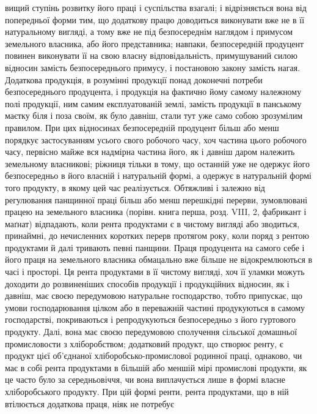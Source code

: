 \parcont{}  %
вищий ступінь розвитку його праці і суспільства взагалі; і відрізняється вона
від попередньої форми тим, що додаткову працю доводиться виконувати вже
не в її натуральному вигляді, а тому вже не під безпосереднім наглядом і
примусом земельного власника, або його представника; навпаки, безпосередній
продуцент повинен виконувати її на свою власну відповідальність, примушуваний
силою відносин замість безпосереднього примусу, і постановою закону замість
нагая. Додаткова продукція, в розумінні продукції понад доконечні потреби
безпосереднього продуцента, і продукція на фактично йому самому належному
полі продукції, ним самим експлуатованій землі, замість продукції в панському
маєтку біля і поза своїм, як було давніш, стали тут уже само собою зрозумілим
правилом. При цих відносинах безпосередній продуцент більш або менш
порядкує застосуванням усього свого робочого часу, хоч частина цього робочого
часу, первісно майже вся надмірна частина його, як і давніш даром належить
земельному власникові; ріжниця тільки в тому, що останній уже не
одержує його безпосередньо в його власній і натуральній формі, а одержує в
натуральній формі того продукту, в якому цей час реалізується. Обтяжливі і
залежно від регулювання панщинної праці більш або менш перешкідні перерви,
зумовлювані працею на земельного власника (порівн. книга перша, розд. VIII, 2,
фабрикант і маґнат) відпадають, коли рента продуктами є в чистому вигляді
або зводиться, принаймні, до нечисленних коротких перерв протягом року,
коли поряд з рентою продуктами й далі тривають певні панщини. Праця продуцента
на самого себе і його праця на земельного власника обмацально
вже більше не відокремлюються в часі і просторі. Ця рента продуктами в її
чистому вигляді, хоч її уламки можуть доходити до розвиненіших способів
продукції і продукційних відносин, як і давніш, має своєю передумовою натуральне
господарство, тобто припускає, що умови господарювання цілком або в
переважній частині продукуються в самому господарстві, покриваються і репродукуються
безпосередньо з його гуртового продукту. Далі, вона має своєю передумовою
сполучення сільської домашньої промисловости з хліборобством; додатковий
продукт, що створює ренту, є продукт цієї об’єднаної хліборобсько-промислової
родинної праці, однаково, чи має в собі рента продуктами в більшій або
меншій мірі промислові продукти, як це часто було за середньовіччя, чи вона
виплачується лише в формі власне хліборобського продукту. При цій формі
ренти, рента продуктами, що в ній втілюється додаткова праця, ніяк не потребує
